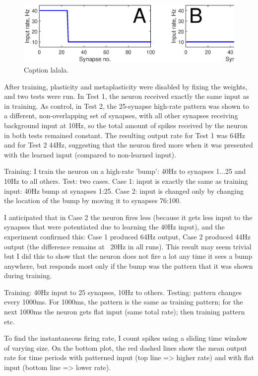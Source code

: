 \documentclass[a4paper,12pt]{report}
\theoremstyle{definition}
\begin{document}
\begin{figure}[h]
    \centering
    \includegraphics[width=\textwidth]{figures/exp2_inputpatterns.eps}
    \caption{Caption lalala.}
    \label{fig:exp2_inputpatterns}
\end{figure}

After training, plasticity and metaplasticity were disabled by fixing the weights, and two tests were run. In Test 1, the neuron received exactly the same input as in training. As control, in Test 2, the 25-synapse high-rate pattern was shown to a different, non-overlapping set of synapses, with all other synapses receiving background input at 10Hz, so the total amount of spikes received by the neuron in both tests remained constant. The resulting output rate for Test 1 was 64Hz and for Test 2 44Hz, suggesting that the neuron fired more when it was presented with the learned input (compared to non-learned input).

Training: I train the neuron on a high-rate 'bump': 40Hz to synapses 1...25 and 10Hz to all others.
Test: two cases.
Case 1: input is exactly the same as training input: 40Hz bump at synapses 1:25.
Case 2: input is changed only by changing the location of the bump by moving it to synapses 76:100.

I anticipated that in Case 2 the neuron fires less (because it gets less input to the synapses that were potentiated due to learning the 40Hz input), and the experiment confirmed this: Case 1 produced 64Hz output, Case 2 produced 44Hz output (the difference remains at ~20Hz in all runs).
This result may seem trivial but I did this to show that the neuron does not fire a lot any time it sees a bump anywhere, but responds most only if the bump was the pattern that it was shown during training.


Training: 40Hz input to 25 synapses, 10Hz to others.
Testing: pattern changes every 1000ms. For 1000ms, the pattern is the same as training pattern; for the next 1000ms the neuron gets flat input (same total rate); then training pattern etc.

To find the instantaneous firing rate, I count spikes using a sliding time window of varying size.
On the bottom plot, the red dashed lines show the mean output rate for time periods with patterned input (top line => higher rate) and with flat input (bottom line => lower rate).
\end{document}
